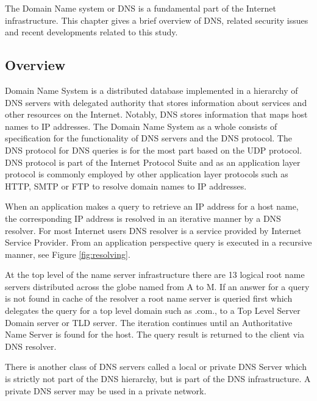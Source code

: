 The Domain Name system or DNS \cite{RFC1035}\cite{RFC1034} is a fundamental part of the Internet infrastructure. This chapter gives a brief overview of DNS, related security issues and recent developments related to this study.

\subsection{Overview}
Domain Name System is a distributed database implemented in a hierarchy of DNS servers with delegated authority that stores information about services and other resources on the Internet. Notably, DNS stores information that maps host names to IP addresses. The Domain Name System as a whole consists of specification for the functionality of DNS servers and the DNS protocol. The DNS protocol for DNS queries is for the most part based on the UDP protocol. DNS protocol is part of the Internet Protocol Suite and as an application layer protocol is commonly employed by other application layer protocols such as HTTP, SMTP or FTP to resolve domain names to IP addresses. \citep{kurose_ross}\cite{tanenbaum} 

When an application makes a query to retrieve an IP address for a host name, the corresponding IP address is resolved in an iterative manner by a DNS resolver. For most Internet users DNS resolver is a service provided by Internet Service Provider. From an application perspective query is executed in a recursive manner, see Figure \ref{fig:resolving}.  

At the top level of the name server infrastructure there are 13 logical root name servers distributed across the globe named from A to M. If an answer for a query is not found in cache of the resolver a root name server is queried first which delegates the query for a top level domain such as .com., to a Top Level Server Domain server or TLD server. The iteration continues until an Authoritative Name Server is found for the host. The query result is returned to the client via DNS resolver. \citep{kurose_ross} \cite{tanenbaum} 

There is another class of DNS servers called a local or private DNS Server which is strictly not part of the DNS hierarchy, but is part of the DNS infrastructure. A private DNS server may be used in a private network. \citep{kurose_ross}


